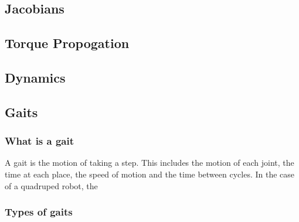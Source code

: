 \subsection{Jacobians}
\subsection{Torque Propogation}
\subsection{Dynamics}
\subsection{Gaits}
    \subsubsection{What is a gait}
    A gait is the motion of taking  a step. This includes the motion of each joint, the time at each place, the speed of motion and the time between cycles. In the case of a quadruped robot, the 
    
    \subsubsection{Types of gaits}
    




